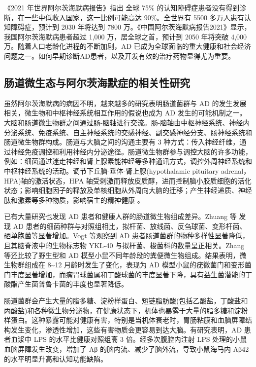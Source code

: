 \documentclass[supercite]{HustGraduPaper}
\begin{document}
《2021 年世界阿尔茨海默病报告》指出 全球 75\% 的认知障碍症患者没有得到诊断，在一些中低收入国家，这一比例可能高达 90\%。全世界有 5500 多万人患有认知障碍症，预计到 2030 年将达到 7800 万\cite{gauthier2021world}。《中国阿尔茨海默病报告2021》显示，我国阿尔茨海默病患者超过 1,000 万，居全球之首，预计到 2050 年将突破 4,000 万\cite{任汝静2021中国阿尔茨海默病报告}。随着人口老龄化进程的不断加剧，AD 已成为全球面临的重大健康和社会经济问题之一。如何早期诊断AD患者，以及开发有效的治疗药物显得尤为重要。


\subsection{肠道微生态与阿尔茨海默症的相关性研究}

虽然阿尔茨海默病的病因不明，越来越多的研究表明肠道菌群与 AD 的发生发展相关，微生物和中枢神经系统相互作用的假说也成为 AD 发生的可能机制之一。大脑和肠道微生物群之间通过肠-脑轴进行交流。肠-脑轴由中枢神经系统、神经内分泌系统、免疫系统、自主神经系统的交感神经、副交感神经分支、肠神经系统和肠道微生物群构成\cite{la2018gut}。肠道与大脑之间的沟通主要有 3 种方式：传入神经纤维，通过神经免疫调控和利用神经内分泌途径\cite{westfall2017microbiome}。肠道微生物群参与调控大脑的许多功能，例如：细菌通过迷走神经和肾上腺素能神经等多种通讯方式，调控外周神经系统和中枢神经系统的活动。调节下丘脑-垂体-肾上腺(hypothalamic pituitary adrenal，HPA)轴的激活状态，HPA 轴受刺激而释放皮质醇，进而控制脑小胶质细胞的活化状态；影响细胞因子的释放及单核细胞从外周向大脑的迁移；产生神经递质、神经肽和激素等多种物质，影响宿主的精神健康\cite{mayer2015gut} 。

已有大量研究也发现 AD 患者和健康人群的肠道微生物组成差异。Zhuang 等\cite{zhuang2018gut} 发现 AD 患者的细菌种群与对照组相比，拟杆菌、放线菌、反刍球菌、变形杆菌、硒单胞菌等显著增加。Vogt 等\cite{vogt2017gut}观察到 AD 患者肠道菌群的物种多样性显著降低，且其脑脊液中的生物标志物 YKL-40 与拟杆菌、梭菌科的数量呈正相关。Zhang 等\cite{zhang2017altered}还比较了野生型和 AD 模型小鼠不同年龄段的粪便微生物组成。结果表明，微生物群组成在 8\textasciitilde12 月龄时发生了变化，表现为 AD 模型小鼠的疣微菌门和变形菌门丰度显著增加，而瘤胃球菌属和丁酸球菌的丰度显著下降，具有益生菌潜能的丁酸酯产生菌普鲁卡菌的丰度也显著降低。

肠道菌群会产生大量的脂多糖、淀粉样蛋白、短链脂肪酸(包括乙酸盐，丁酸盐和丙酸盐)和各种微生物分泌物，在健康状态下，机体也暴露于大量的脂多糖和淀粉样蛋白\cite{zhao2015microbiome}。这种暴露可能对健康有害，特别是当机体衰老时，胃肠粘膜和血脑屏障结构发生变化，渗透性增加，这些有害物质会更容易到达大脑。有研究表明，AD 患者血浆中 LPS 的水平比健康对照组高 3 倍\cite{zhang2009circulating}。经多次腹腔内注射 LPS 处理的小鼠血脑屏障发生改变，增加了 Aβ 的脑内流、减少了脑外流，导致小鼠海马内 Aβ42 的水平明显升高和认知功能缺陷\cite{jaeger2009lipopolysaccharide}。
\end{document}
